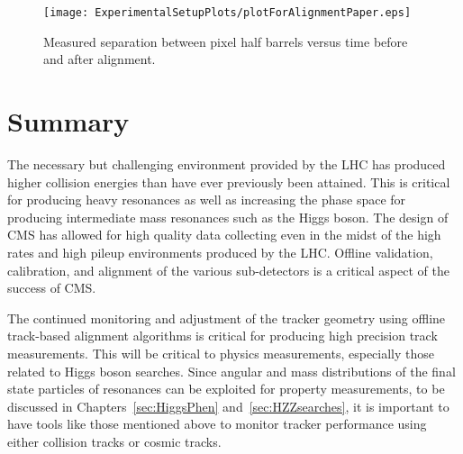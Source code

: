 \begin{figure}
\begin{center}
\texttt{[image: ExperimentalSetupPlots/plotForAlignmentPaper.eps]}
\caption{Measured separation between pixel half barrels versus time
before and after alignment.}
\label{fig:DzVStime}
\end{center}
\end{figure}

\section{Summary}

The necessary but challenging environment provided by the LHC has produced higher collision energies than have ever previously been attained.  This is critical for 
producing heavy resonances as well as increasing the phase space
for producing intermediate mass resonances such as the Higgs boson.  
The design of CMS has allowed for high quality data collecting even in the midst 
of the high rates and high pileup environments produced by the LHC.  Offline validation,
calibration, and alignment of the various sub-detectors is a critical 
aspect of the success of CMS.  

The continued monitoring and adjustment of the tracker geometry using offline
track-based alignment algorithms is critical for producing high precision
track measurements.  This will be critical to physics measurements,
especially those related to Higgs boson searches.  Since angular and mass distributions of the final state 
particles of resonances can be exploited for property measurements, to be
discussed in Chapters~\ref{sec:HiggsPhen} and~\ref{sec:HZZsearches}, it is 
important to have tools like those mentioned above to monitor tracker 
performance using either collision tracks or cosmic tracks.
